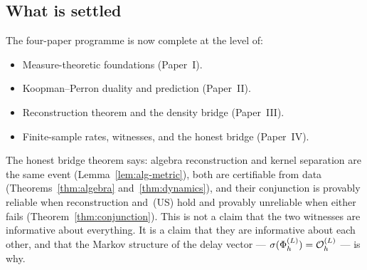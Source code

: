 \subsection{What is settled}

The four-paper programme is now complete at the level of:
\begin{itemize}
  \item Measure-theoretic foundations (Paper~I).
  \item Koopman--Perron duality and prediction (Paper~II).
  \item Reconstruction theorem and the density bridge (Paper~III).
  \item Finite-sample rates, witnesses, and the honest bridge (Paper~IV).
\end{itemize}
The honest bridge theorem says: algebra reconstruction and kernel separation
are the same event (Lemma~\ref{lem:alg-metric}), both are certifiable from data
(Theorems~\ref{thm:algebra} and~\ref{thm:dynamics}), and their conjunction is
provably reliable when reconstruction and~(US) hold and provably unreliable when
either fails (Theorem~\ref{thm:conjunction}).
This is not a claim that the two witnesses are informative about everything.
It is a claim that they are informative about each other, and that the Markov
structure of the delay vector --- $\sigma(\Phi_h^{(L)}) = \mathcal{O}_h^{(L)}$ --- is why.



